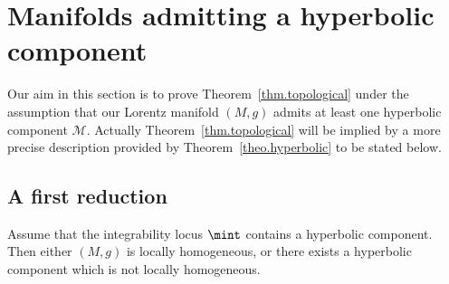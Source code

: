 \section{Manifolds admitting a hyperbolic component}\label{sec.hyperbolic}

Our aim in this section is to prove Theorem~\ref{thm.topological} under the assumption that our Lorentz manifold $(M,g)$ admits at least one hyperbolic component ${\mathcal M}$. Actually Theorem~\ref{thm.topological} will be implied by a more precise description provided by Theorem~\ref{theo.hyperbolic} to be stated below.

\subsection{A first reduction}



\begin{prop}\label{prop.hyperbolic}
Assume that the integrability locus $\mint$ contains a hyperbolic component. Then either $(M,g)$ is locally homogeneous, or there exists a hyperbolic component which is not locally homogeneous.
\end{prop}

